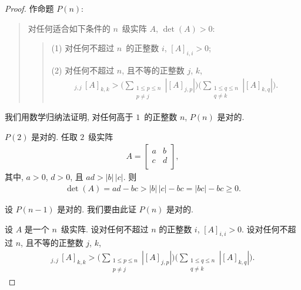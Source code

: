 \documentclass[../libro.tex]{subfiles}
\begin{document}
\begin{proof}
    作命题 \(P(n)\):
    \begin{quotation}
        对任何适合如下条件的 \(n\)~级实阵 \(A\),
        \(\det {(A)} > 0\):
        \begin{quotation}
            (1)
            对任何不超过 \(n\)~的正整数 \(i\),
            \([A]_{i,i} > 0\);

            (2)
            对任何不超过 \(n\), 且不等的正整数 \(j\), \(k\),
            \begin{align*}
                [A]_{j,j}\,[A]_{k,k} >
                \Bigg(
                    \sum_{\substack{1 \leq p \leq n \\
                    p \neq j}} {|[A]_{j,p}|}
                \Bigg)
                \Bigg(
                    \sum_{\substack{1 \leq q \leq n \\
                    q \neq k}} {|[A]_{k,q}|}
                \Bigg).
            \end{align*}
        \end{quotation}
    \end{quotation}
    我们用数学归纳法证明,
    对任何高于 \(1\)~的正整数 \(n\),
    \(P(n)\) 是对的.

    \(P(2)\) 是对的.
    任取 \(2\)~级实阵
    \begin{align*}
        A =
        \begin{bmatrix}
            a & b \\
            c & d \\
        \end{bmatrix},
    \end{align*}
    其中, \(a > 0\), \(d > 0\),
    且 \(a d > |b|\,|c|\).
    则
    \begin{align*}
        \det {(A)} = ad - bc > |b|\,|c| - bc
        = |bc| - bc \geq 0.
    \end{align*}

    设 \(P(n-1)\) 是对的.
    我们要由此证 \(P(n)\) 是对的.

    设 \(A\) 是一个 \(n\)~级实阵.
    设对任何不超过 \(n\) 的正整数 \(i\),
    \([A]_{i,i} > 0\).
    设对任何不超过 \(n\), 且不等的正整数 \(j\), \(k\),
    \begin{align*}
        [A]_{j,j}\,[A]_{k,k} >
        \Bigg(
            \sum_{\substack{1 \leq p \leq n \\
            p \neq j}} {|[A]_{j,p}|}
        \Bigg)
        \Bigg(
            \sum_{\substack{1 \leq q \leq n \\
            q \neq k}} {|[A]_{k,q}|}
        \Bigg).
    \end{align*}


\end{proof}
\end{document}
